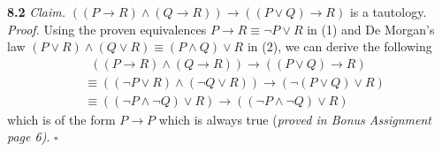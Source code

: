 \documentclass[11pt]{article}
\begin{document}
\noindent \textbf{8.2 } \emph{Claim. } $((P \rightarrow R)\land (Q \rightarrow R)) \rightarrow ((P \lor Q) \rightarrow R)$ is a tautology. \medskip \\
\emph{Proof. } Using the proven equivalences $P \rightarrow R \equiv \neg P \lor R$  in (1) and De Morgan's law $(P \lor R) \land (Q \lor R) \equiv (P \land Q) \lor R$ in (2), we can derive the following
\begin{align}
   &  \, \, \, ((P \rightarrow R)\land (Q \rightarrow R)) \rightarrow ((P \lor Q) \rightarrow R) \\
    & \equiv  ((\neg P \lor R) \land (\neg Q \lor R)) \rightarrow (\neg(P \lor Q) \lor R) \\
    & \equiv ((\neg P \land \neg Q) \lor R) \rightarrow ((\neg P \land \neg Q) \lor R) 
\end{align}
which is of the form $P \rightarrow P$ which is always true (\emph{proved in Bonus Assignment page 6)}. \hfill $\square$
\end{document}
